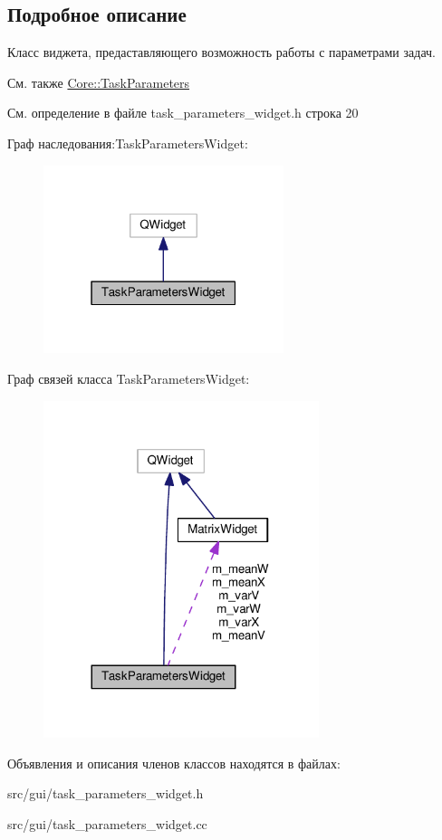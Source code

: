 \subsection{Подробное описание}
Класс виджета, предаставляющего возможность работы с параметрами задач. 

\begin{DoxySeeAlso}{См. также}
\hyperlink{namespace_core_a34db09964ddb6b4af04cc94b02a49e29}{Core\+::\+Task\+Parameters} 
\end{DoxySeeAlso}


См. определение в файле task\+\_\+parameters\+\_\+widget.\+h строка 20



Граф наследования\+:Task\+Parameters\+Widget\+:
\nopagebreak
\begin{figure}[H]
\begin{center}
\leavevmode
\includegraphics[width=199pt]{class_task_parameters_widget__inherit__graph}
\end{center}
\end{figure}


Граф связей класса Task\+Parameters\+Widget\+:
\nopagebreak
\begin{figure}[H]
\begin{center}
\leavevmode
\includegraphics[width=228pt]{class_task_parameters_widget__coll__graph}
\end{center}
\end{figure}


Объявления и описания членов классов находятся в файлах\+:\begin{DoxyCompactItemize}
\item 
src/gui/task\+\_\+parameters\+\_\+widget.\+h\item 
src/gui/task\+\_\+parameters\+\_\+widget.\+cc\end{DoxyCompactItemize}
